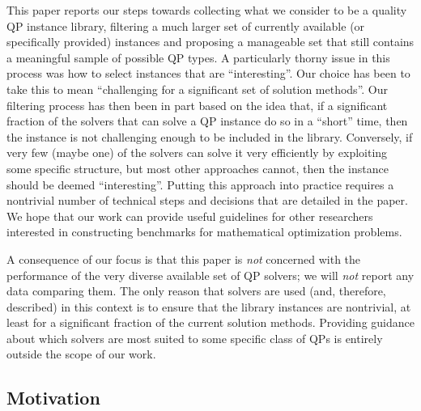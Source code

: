 This paper reports our steps towards collecting what we consider to be a quality QP instance library, filtering a much larger set of currently available (or specifically provided) instances and proposing a manageable set that still contains a meaningful sample of possible QP types. A particularly thorny issue in this process was how to select instances that are ``interesting''. Our choice has been to take this to mean ``challenging for a significant set of solution methods''. Our filtering process has then been in part based on the idea that, if a significant fraction of the solvers that can solve a QP instance do so in a ``short'' time, then the instance is not challenging enough to be included in the library. Conversely, if very few (maybe one) of the solvers can solve it very efficiently by exploiting some specific structure, but most other approaches cannot, then the instance should be deemed ``interesting''. Putting this approach into practice requires a nontrivial number of technical steps and decisions that are detailed in the paper. We hope that our work can provide useful guidelines for other researchers interested in constructing benchmarks for mathematical optimization problems.

A consequence of our focus is that this paper is \emph{not} concerned with the performance of the very diverse available set of QP solvers; we will \emph{not} report any data comparing them. The only reason that solvers are used (and, therefore, described) in this context is to ensure that the library instances are nontrivial, at least for a significant fraction of the current solution methods. Providing guidance about which solvers are most suited to some specific class of QPs is entirely outside the scope of our work.

\subsection{Motivation}\label{subsec:motiv}

